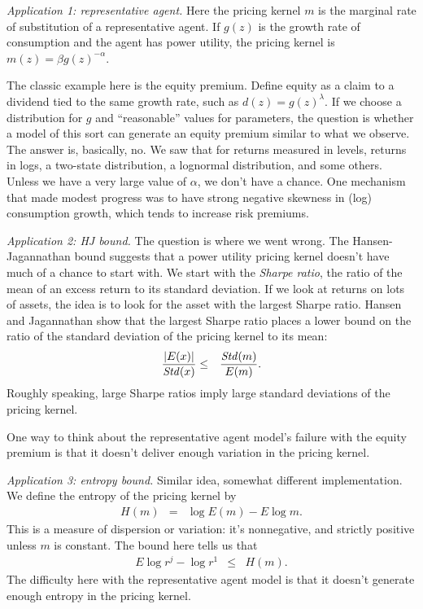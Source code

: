 \documentclass[11pt]{article}
\begin{document}
{\it Application 1:  representative agent.\/}
Here the pricing kernel $m$ is the marginal rate of substitution
of a representative agent.
If $g(z)$ is the growth rate of consumption and the agent has power utility,
the pricing kernel is
$ m(z) = \beta g(z)^{-\alpha}$.

The classic example here is the equity premium.
Define equity as a claim to a dividend tied to the same growth rate,
such as $ d(z) = g(z)^\lambda$.
If we choose a distribution for $g$ and ``reasonable'' values for  parameters,
the question is whether a model of this sort can generate an equity premium similar
to what we observe.
The answer is, basically, no.
We saw that for returns measured in levels, returns in logs,
a two-state distribution, a lognormal distribution, and some others.
Unless we have a very large value of $\alpha$, we don't have a chance.
One mechanism that made modest progress was to have strong negative skewness
in (log) consumption growth, which tends to increase risk premiums.


{\it Application 2: HJ bound.\/}
The question is where we went wrong.
The Hansen-Jagannathan bound suggests that a power utility pricing kernel
doesn't have much of a chance to start with.
We start with the {\it Sharpe ratio\/}, the ratio of the mean of an excess return
to its standard deviation.
If we look at returns on lots of assets, the idea is to look for the asset
with the largest Sharpe ratio.
Hansen and Jagannathan show that the largest Sharpe ratio places a lower bound on
the ratio of the standard deviation of the pricing kernel to its mean:
\begin{eqnarray*}
  \frac{| E(x)|}{ \mbox{\it Std\/}(x)} &\leq& \frac{ \mbox{\it Std\/}(m)}{E(m)} .
\end{eqnarray*}
Roughly speaking, large Sharpe ratios imply large standard deviations of the pricing kernel.

One way to think about the representative agent model's failure with the equity premium
is that it doesn't deliver enough variation in the pricing kernel.


{\it Application 3: entropy bound.\/}
Similar idea, somewhat different implementation.
We define the entropy of the pricing kernel by
\begin{eqnarray*}
    H(m) &=& \log E(m) - E \log m .
\end{eqnarray*}
This is a measure of dispersion or variation:
it's nonnegative, and strictly positive unless $m$ is constant.
The bound here tells us that
\begin{eqnarray*}
    E  \log r^j - \log r^1  &\leq&  H(m) .
\end{eqnarray*}
The difficulty here with the representative agent model is
that it doesn't generate enough entropy in the pricing kernel.
\end{document}
